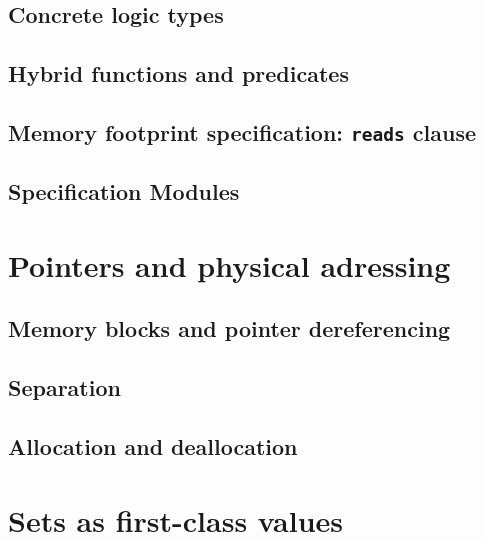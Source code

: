 \experimental

\subsection{Concrete logic types}\label{sec:concrete-logic-types}
\experimental

\subsection{Hybrid functions and predicates}
\label{sec:logicalstates}

\subsection{Memory footprint specification: \texorpdfstring{\lstinline|reads|}{reads} clause}

\experimental

\subsection{Specification Modules}
\label{sec:specmodules}

\section{Pointers and physical adressing}
\label{sec:pointers}

\subsection{Memory blocks and pointer dereferencing}
\label{subsec:memory}

\subsection{Separation}
\label{sec:separated}

\experimental

\subsection{Allocation and deallocation}

\experimental

\section{Sets as first-class values}

